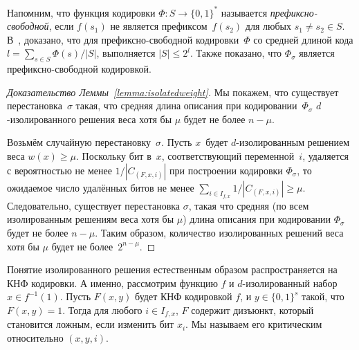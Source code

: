 Напомним, что функция кодировки $\Phi \colon S \rightarrow \{0,1\}^*$ называется \emph{префиксно-свободной}, 
если $f(s_1)$ не является префиксом~$f(s_2)$ для любых $s_1 \neq s_2 \in S$.
В~\cite[Fact~1]{DBLP:journals/cjtcs/PaturiPZ99}, 
доказано, что для префиксно-свободной кодировки~$\Phi$
со средней длиной кода $l=\sum_{s \in S}\Phi(s)/|S|$, 
выполняется $|S| \le 2^l$.   
Также показано, что $\Phi_{\sigma}$ является префиксно-свободной кодировкой.

\begin{proof}[Доказательство Леммы~\ref{lemma:isolatedweight}]
	Мы покажем, что существует перестановка~$\sigma$ такая,
	что средняя длина описания при кодировании~$\Phi_\sigma$
	$d$-изолированного решения веса хотя бы $\mu$ будет не более $n - \mu$. 
	
	Возьмём случайную перестановку~$\sigma$.
	Пусть $x$~будет $d$-изолированным решением веса $w(x) \ge \mu$.
	Поскольку бит в~$x$, соответствующий 
	переменной~$i$, удаляется с вероятностью не менее $1 / |C_{(F, x, i)}|$ при построении кодировки $\Phi_{\sigma}$, 
	то ожидаемое
	число удалённых битов не менее $\sum_{i \in I_{f, x}} 1/|C_{(F, x, i)}| \ge \mu$.
	Следовательно, существует перестановка $\sigma$, такая что средняя
	(по всем изолированным решениям веса хотя бы
	$\mu$) длина описания при кодировании $\Phi_\sigma$ будет
	не более $n - \mu$. Таким образом, количество изолированных решений веса хотя бы $\mu$ будет
	не более~$2^{n - \mu}$. 
\end{proof}

Понятие изолированного решения естественным образом распространяется на КНФ кодировки.
А именно, рассмотрим функцию $f$ и $d$-изолированный набор $x \in f^{-1}(1)$.
Пусть $F(x, y)$ будет КНФ кодировкой $f$, 
и $y \in \{0, 1\}^s$ такой, что $F(x, y) = 1$.
Тогда для любого $i \in I_{f, x}$,
$F$ содержит дизъюнкт, который становится ложным, если изменить бит $x_i$.
Мы называем его критическим относительно $(x,y,i)$.

